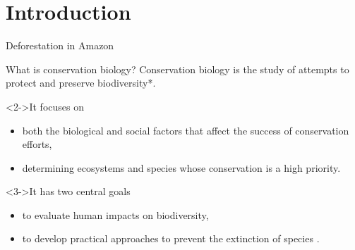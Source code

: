 \section{Introduction}
{
	\begin{frame}{Deforestation in Amazon}
	\centering
\end{frame}
}

{
	\begin{frame}[t]{What is conservation biology?}
Conservation biology is the study of attempts to protect and preserve \alert{biodiversity}*.
\begin{block}<2->{It focuses on}
	\begin{itemize}		
		\item<2-> both the biological and social factors that affect the success of conservation efforts,
		\item<2-> determining ecosystems and species whose conservation is a high priority.
	\end{itemize}
\end{block}

\begin{block}<3->{It has two central goals}
	\begin{itemize}		
		\item<3-> to evaluate human impacts on biodiversity,
		\item<3-> to develop practical approaches to prevent the extinction of species \cite{wilson1992diversity}.
	\end{itemize}
\end{block}
\end{frame}}


